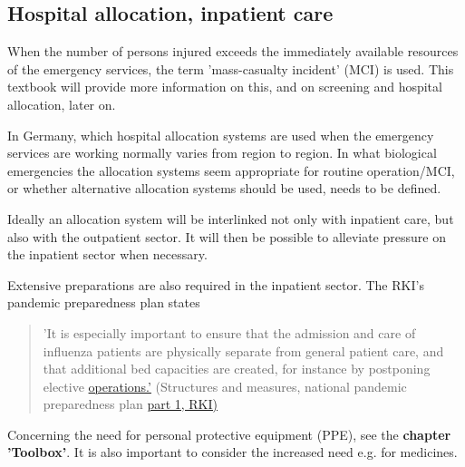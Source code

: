\documentclass{article}
\begin{document}
\subsection{Hospital allocation, inpatient care}\label{H3152585}



When the number of persons injured exceeds the immediately available resources of the emergency services, the term 'mass-casualty incident' (MCI) is used. This textbook will provide more information on this, and on screening and hospital allocation, later on.


In Germany, which hospital allocation systems are used when the emergency services are working normally varies from region to region. In what biological emergencies the allocation systems seem appropriate for routine operation/MCI, or whether alternative allocation systems should be used, needs to be defined.


Ideally an allocation system will be interlinked not only with inpatient care, but also with the outpatient sector. It will then be possible to alleviate pressure on the inpatient sector when necessary.


Extensive preparations are also required in the inpatient sector. The RKI's pandemic preparedness plan states

\begin{quote}



'It is especially important to ensure that the admission and care of influenza patients are physically separate from general patient care, and that additional bed capacities are created, for instance by postponing elective \href{https://edoc.rki.de/handle/176904/187}{operations.'} (Structures and measures, national pandemic preparedness plan \href{https://edoc.rki.de/handle/176904/187}{part 1, RKI)}


\end{quote}


Concerning the need for personal protective equipment (PPE), see the \textbf{chapter 'Toolbox'}. It is also important to consider the increased need e.g. for medicines.
\end{document}

